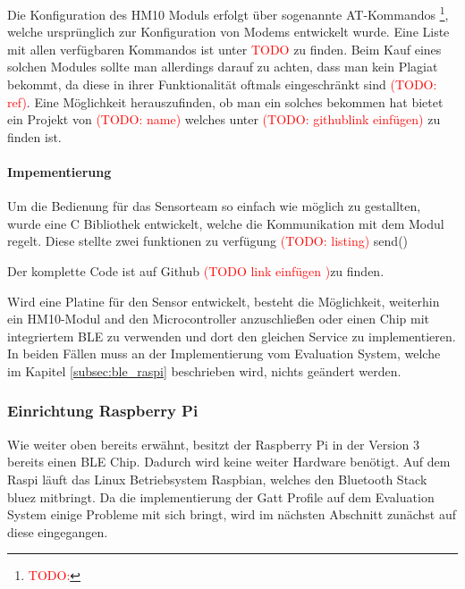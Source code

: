 Die Konfiguration des HM10 Moduls erfolgt über sogenannte AT-Kommandos \footnote{\textcolor{red}{TODO:} }, welche ursprünglich zur Konfiguration von Modems entwickelt wurde. Eine Liste mit allen verfügbaren Kommandos ist unter \textcolor{red}{TODO } zu finden. Beim Kauf eines solchen Modules sollte man allerdings darauf zu achten, dass man kein Plagiat bekommt, da diese in ihrer Funktionalität oftmals eingeschränkt sind \textcolor{red}{(TODO: ref)}. Eine Möglichkeit herauszufinden, ob man ein solches bekommen hat bietet ein Projekt von \textcolor{red}{(TODO: name)} welches unter \textcolor{red}{(TODO: githublink einfügen)} zu finden ist.

\paragraph{Impementierung}
Um die Bedienung für das Sensorteam so einfach wie möglich zu gestallten, wurde eine C Bibliothek entwickelt, welche die Kommunikation mit dem Modul regelt. Diese stellte zwei funktionen zu verfügung \textcolor{red}{(TODO: listing)} send() %

Der komplette Code ist auf Github \textcolor{red}{(TODO link einfügen )}zu finden.

Wird eine Platine für den Sensor entwickelt, besteht die Möglichkeit, weiterhin ein HM10-Modul and den Microcontroller anzuschließen oder einen Chip mit integriertem BLE zu verwenden und dort den gleichen Service zu implementieren. In beiden Fällen muss an der Implementierung vom Evaluation System, welche im Kapitel \ref{subsec:ble_raspi} beschrieben wird, nichts geändert werden.

\subsubsection{Einrichtung Raspberry Pi}
Wie weiter oben bereits erwähnt, besitzt der Raspberry Pi in der Version 3 bereits einen BLE Chip. Dadurch wird keine weiter Hardware benötigt. Auf dem Raspi läuft das Linux Betriebsystem Raspbian, welches den Bluetooth Stack bluez mitbringt. Da die implementierung der Gatt Profile auf dem Evaluation System einige Probleme mit sich bringt, wird im nächsten Abschnitt zunächst auf diese eingegangen.

